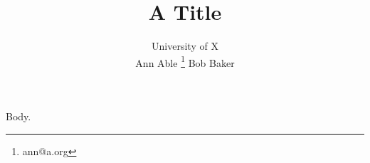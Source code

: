 \documentclass{article}
\title{A Title}
\author{\footnotemark[1]University of X\\ Ann Able \thanks{ann@a.org} Bob Baker}
\begin{document}
\maketitle Body.
\end{document}
